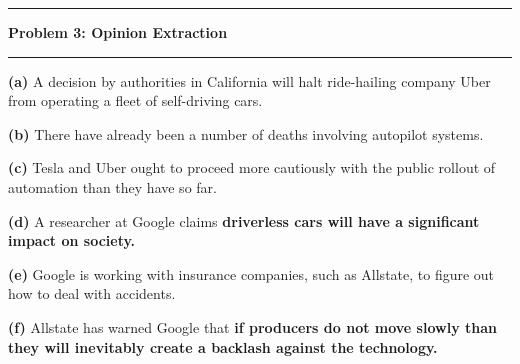 \documentclass[11pt]{article}
\newcommand\question[2]{\vspace{.25in}\hrule\textbf{#1: #2}\vspace{.5em}\hrule\vspace{.10in}}
\renewcommand\part[1]{\vspace{.10in}\textbf{(#1)}}
\begin{document}
\question{Problem 3}{Opinion Extraction}

\part{a} A decision by authorities in California will halt ride-hailing company Uber from operating a fleet of self-driving cars.


\part{b} There have already been a number of deaths involving autopilot systems.


\part{c} Tesla and Uber ought to proceed more cautiously with the public rollout of automation than they have so far.


\part{d} A researcher at Google claims \textbf{driverless cars will have a significant impact on society.}


\part{e} Google is working with insurance companies, such as Allstate, to figure out how to deal with accidents.


\part{f} Allstate has warned Google that \textbf{if producers do not move slowly than they will inevitably create a backlash against the technology.}

\end{document}

